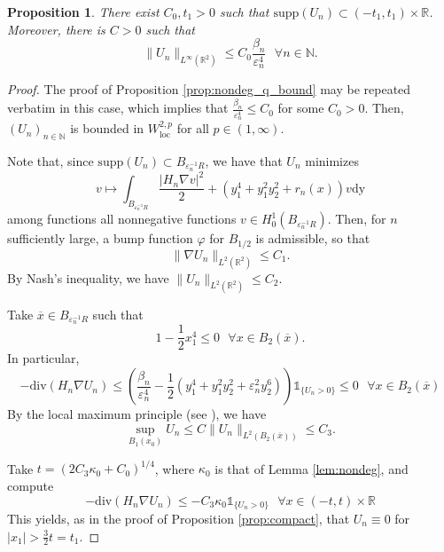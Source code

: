 \documentclass[10pt,a4paper]{article}
\newcommand{\loc}{\mathrm{loc}}
\newcommand{\NN}{\mathbb{N}}
\newcommand{\RR}{\mathbb{R}}
\newcommand{\divg}{\mathrm{div}}
\newcommand{\supp}{\mathrm{supp}}
\newcommand{\faskip}{\hspace{8pt}}
\newtheorem{prop}[thm]{Proposition}
\numberwithin{equation}{section}
\begin{document}
\begin{prop}
	\label{prop:supp_noncoercive}
	There exist $ C_0, t_1 > 0 $ such that $ \supp (U_n) \subset (-t_1, t_1) \times \RR $. Moreover, there is $ C > 0 $ such that 
	\begin{equation}
		\label{eq:infty_noncoercive}
		\|U_n\|_{L^{\infty}(\RR^{2})}\leq C_0 \frac{\beta_n}{\varepsilon_n^{4}} \faskip \forall n\in \NN.
	\end{equation}
\end{prop}
\begin{proof}
	The proof of Proposition \ref{prop:nondeg_q_bound} may be repeated verbatim in this case, which implies that $ \frac{\beta_n}{\varepsilon_n^{4}} \leq C_0 $ for some $ C_0 > 0 $. Then, $ (U_n)_{n\in \NN} $ is bounded in $ W^{2,p}_{\loc} $ for all $ p \in (1,\infty) $.

	Note that, since $ \supp (U_n) \subset B_{\varepsilon_n^{-1}R} $, we have that $ U_n $ minimizes 
	\[
		v\mapsto \int_{B_{\varepsilon_n^{-1}R}} \frac{|H_n \nabla v|^{2}}{2} + \left( y_1^{4} +y_1^{2}y_2^{2} + r_n(x) \right) v \mathrm{dy} 
	\]
	among functions all nonnegative functions $ v \in H^{1}_0(B_{\varepsilon_n^{-1}R}) $. Then, for $ n $ sufficiently large, a bump function $ \varphi $ for $ B_{1/2} $ is admissible, so that
	\[\|\nabla U_n\|_{L^{2}(\RR^{2})} \leq C_1.\]
By Nash's inequality, we have $ \|U_n\|_{L^{2}(\RR^{2})} \leq C_2 $.

Take $ \overline{x} \in B_{\varepsilon_n^{-1}R}$ such that 
\[
	1 - \frac{1}{2} x_1^{4} \leq 0 \faskip \forall x \in B_2(\overline{x}).
\]
In particular, 
\[
	-\divg(H_n\nabla U_n)\leq \left( \frac{\beta_n}{\varepsilon_n^{4}} - \frac{1}{2}(y_1^{4} + y_1^2 y_2^2 + \varepsilon_n^{2}y_2^6) \right) \mathbb{1}_{\{U_n > 0\}} \leq 0 \faskip \forall x\in B_2(\overline{x})
\]
By the local maximum principle (see \cite[Theorem 8.17]{GT83}), we have
\[
	\sup_{B_1(x_0)} U_n \leq C \| U_n \|_{L^{2}(B_2(\overline{x}))} \leq C_3.
\]

Take $ t = (2C_3 \kappa_0 + C_0)^{1/4} $, where $ \kappa_0 $ is that of Lemma \ref{lem:nondeg}, and compute
\[
	-\divg(H_n \nabla U_n) \leq -C_3 \kappa_0 \mathbb{1}_{\{U_n > 0 \}} \faskip \forall x \in (- t, t) \times \RR
\]
This yields, as in the proof of Proposition \ref{prop:compact}, that $ U_n \equiv 0 $ for $ |x_1| > \frac{3}{2}t = t_1 $.


\end{proof}
\end{document}
